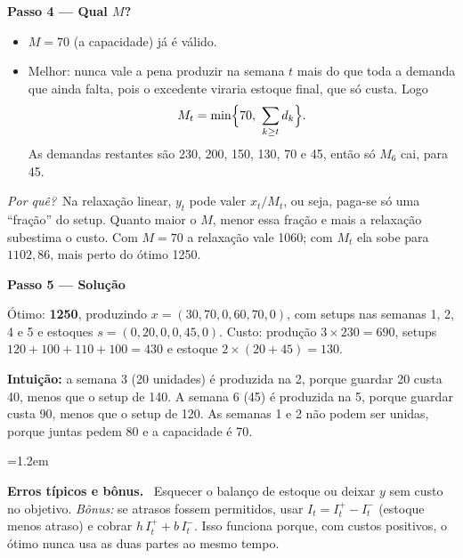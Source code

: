 \documentclass[11pt,a4paper]{article}
\newcommand{\passo}[1]{\par\medskip\textbf{#1}\par}
\newcommand{\porque}{\textit{Por quê?}\ }
\newenvironment{nota}[1]{\par\smallskip\begin{list}{}{\leftmargin=1.2em\rightmargin=0pt}\item[]\textbf{#1.}\ }{\end{list}}
\begin{document}
\passo{Passo 4 --- Qual $M$?}
\begin{itemize}
  \item $M=70$ (a capacidade) já é válido.
  \item Melhor: nunca vale a pena produzir na semana $t$ mais do que toda a demanda que ainda falta, pois o excedente viraria
        estoque final, que só custa. Logo
        \[
          M_t = \min\Bigl\{70,\ \sum_{k\ge t} d_k\Bigr\}.
        \]
        As demandas restantes são 230, 200, 150, 130, 70 e 45, então só $M_6$ cai, para 45.
\end{itemize}
\porque Na relaxação linear, $y_t$ pode valer $x_t/M_t$, ou seja, paga-se só uma ``fração'' do setup. Quanto maior o $M$, menor
essa fração e mais a relaxação subestima o custo. Com $M=70$ a relaxação vale 1060; com $M_t$ ela sobe para $1102{,}86$, mais
perto do ótimo 1250.

\passo{Passo 5 --- Solução}
Ótimo: \textbf{1250}, produzindo $x=(30, 70, 0, 60, 70, 0)$, com setups nas semanas 1, 2, 4 e 5 e estoques
$s=(0, 20, 0, 0, 45, 0)$. Custo: produção $3\times230=690$, setups $120+100+110+100=430$ e estoque
$2\times(20+45)=130$.

\textbf{Intuição:} a semana 3 (20 unidades) é produzida na 2, porque guardar 20 custa 40, menos que o setup de 140. A
semana 6 (45) é produzida na 5, porque guardar custa 90, menos que o setup de 120. As semanas 1 e 2 não podem ser unidas, porque
juntas pedem 80 e a capacidade é 70.

\begin{nota}{Erros típicos e bônus}
Esquecer o balanço de estoque ou deixar $y$ sem custo no objetivo. \textit{Bônus:} se atrasos fossem permitidos, usar
$I_t = I_t^{+} - I_t^{-}$ (estoque menos atraso) e cobrar $h\,I_t^{+} + b\,I_t^{-}$. Isso funciona porque, com custos
positivos, o ótimo nunca usa as duas partes ao mesmo tempo.
\end{nota}

\end{document}
